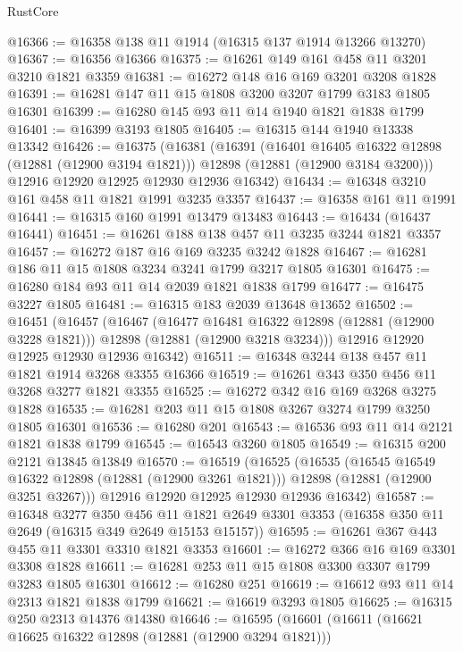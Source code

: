 \begin{lexlean}{RustCore}
\begin{coremodule}
@16366 := @16358 @138 @11 @1914 (@16315 @137 @1914 @13266 @13270)
@16367 := @16356 @16366
@16375 := @16261 @149 @161 @458 @11 @3201 @3210 @1821 @3359
@16381 := @16272 @148 @16 @169 @3201 @3208 @1828
@16391 := @16281 @147 @11 @15 @1808 @3200 @3207 @1799 @3183 @1805 @16301
@16399 := @16280 @145 @93 @11 @14 @1940 @1821 @1838 @1799
@16401 := @16399 @3193 @1805
@16405 := @16315 @144 @1940 @13338 @13342
@16426 := @16375
    (@16381
      (@16391
        (@16401 @16405 @16322 @12898 (@12881 (@12900 @3194 @1821)))
        @12898
        (@12881 (@12900 @3184 @3200)))
      @12916
      @12920
      @12925
      @12930
      @12936
      @16342)
@16434 := @16348 @3210 @161 @458 @11 @1821 @1991 @3235 @3357
@16437 := @16358 @161 @11 @1991
@16441 := @16315 @160 @1991 @13479 @13483
@16443 := @16434 (@16437 @16441)
@16451 := @16261 @188 @138 @457 @11 @3235 @3244 @1821 @3357
@16457 := @16272 @187 @16 @169 @3235 @3242 @1828
@16467 := @16281 @186 @11 @15 @1808 @3234 @3241 @1799 @3217 @1805 @16301
@16475 := @16280 @184 @93 @11 @14 @2039 @1821 @1838 @1799
@16477 := @16475 @3227 @1805
@16481 := @16315 @183 @2039 @13648 @13652
@16502 := @16451
    (@16457
      (@16467
        (@16477 @16481 @16322 @12898 (@12881 (@12900 @3228 @1821)))
        @12898
        (@12881 (@12900 @3218 @3234)))
      @12916
      @12920
      @12925
      @12930
      @12936
      @16342)
@16511 := @16348 @3244 @138 @457 @11 @1821 @1914 @3268 @3355 @16366
@16519 := @16261 @343 @350 @456 @11 @3268 @3277 @1821 @3355
@16525 := @16272 @342 @16 @169 @3268 @3275 @1828
@16535 := @16281 @203 @11 @15 @1808 @3267 @3274 @1799 @3250 @1805 @16301
@16536 := @16280 @201
@16543 := @16536 @93 @11 @14 @2121 @1821 @1838 @1799
@16545 := @16543 @3260 @1805
@16549 := @16315 @200 @2121 @13845 @13849
@16570 := @16519
    (@16525
      (@16535
        (@16545 @16549 @16322 @12898 (@12881 (@12900 @3261 @1821)))
        @12898
        (@12881 (@12900 @3251 @3267)))
      @12916
      @12920
      @12925
      @12930
      @12936
      @16342)
@16587 := @16348
    @3277
    @350
    @456
    @11
    @1821
    @2649
    @3301
    @3353
    (@16358 @350 @11 @2649 (@16315 @349 @2649 @15153 @15157))
@16595 := @16261 @367 @443 @455 @11 @3301 @3310 @1821 @3353
@16601 := @16272 @366 @16 @169 @3301 @3308 @1828
@16611 := @16281 @253 @11 @15 @1808 @3300 @3307 @1799 @3283 @1805 @16301
@16612 := @16280 @251
@16619 := @16612 @93 @11 @14 @2313 @1821 @1838 @1799
@16621 := @16619 @3293 @1805
@16625 := @16315 @250 @2313 @14376 @14380
@16646 := @16595
    (@16601
      (@16611
        (@16621 @16625 @16322 @12898 (@12881 (@12900 @3294 @1821)))

\end{coremodule}
\end{lexlean}
